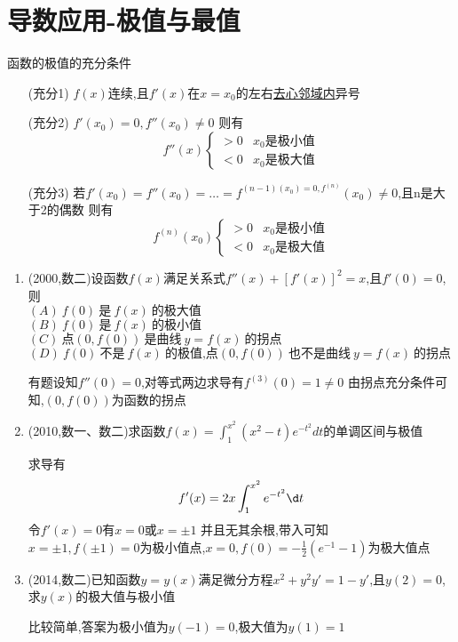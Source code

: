 \documentclass[12pt, a4paper, oneside, UTF8]{ctexbook}
\begin{document}
\section{导数应用-极值与最值}
\begin{remark} 
    函数的极值的充分条件
    \begin{enumerate}
        \item [(充分1)] $f(x)$连续,且$f'(x)$在$x=x_0$的左右\underline{去心邻域内}异号
        \item [(充分2)] $f'(x_0)=0,f''(x_0)\neq 0$ 则有
        $$f''(x)
        \begin{cases}
            >0 & x_0\text{是极小值} \\
            <0 & x_0\text{是极大值}
        \end{cases}
        $$
        \item [(充分3)] 若$f'(x_0)=f''(x_0)=\ldots=f^{(n-1)(x_0)=0,f^{(n)}}(x_0)\neq 0$,且n是大于2的偶数
        则有
        $$
        f^{(n)}(x_0)
        \begin{cases}
            >0 & x_0\text{是极小值} \\
            <0 & x_0\text{是极大值}
        \end{cases}
        $$
    \end{enumerate}
\end{remark}
\begin{enumerate}[label=\arabic*.,start=17]
    \item  (2000,数二)设函数$f(x)$满足关系式$f''(x)+[f'(x)]^2=x$,且$f'(0)=0$,则 \\
    $(A)\ f(0)\ \text{是}\ f(x)\ \text{的极大值}$ \\
    $(B)\ f(0)\ \text{是}\ f(x)\ \text{的极小值}$ \\
    $(C)\ \text{点}(0,f(0))\ \text{是曲线}\ y=f(x)\ \text{的拐点}$ \\
    $(D)\ f(0)\ \text{不是}\ f(x)\ \text{的极值,点}(0,f(0))\ \text{也不是曲线}\ y=f(x)\ \text{的拐点}$
    
    \begin{solution}
    有题设知$f''(0)=0$,对等式两边求导有$f^{(3)}(0)=1\neq 0$ 由拐点充分条件可知,$(0,f(0))$为函数的拐点
    \end{solution}
    
    \item  (2010,数一、数二)求函数$f(x)=\int_1^{x^2}(x^2-t)e^{-t^2}dt$的单调区间与极值
    
    \begin{solution}
    求导有
    $$
    f'(x)=2x\int_{1}^{x^2}e^{-t^2}\d t 
    $$
    令$f'(x)=0$有$x=0$或$x=\pm 1$ 并且无其余根,带入可知 \\
    $x=\pm 1,f(\pm 1)=0$为极小值点,$x=0,f(0)=-\frac{1}{2}(e^{-1}-1)$为极大值点
    \end{solution}
    
    \item  (2014,数二)已知函数$y=y(x)$满足微分方程$x^2+y^2y'=1-y'$,且$y(2)=0$,求$y(x)$的极大值与极小值
    
    \begin{solution}
    比较简单,答案为极小值为$y(-1)=0$,极大值为$y(1)=1$
    \end{solution}
\end{enumerate}
\end{document}
